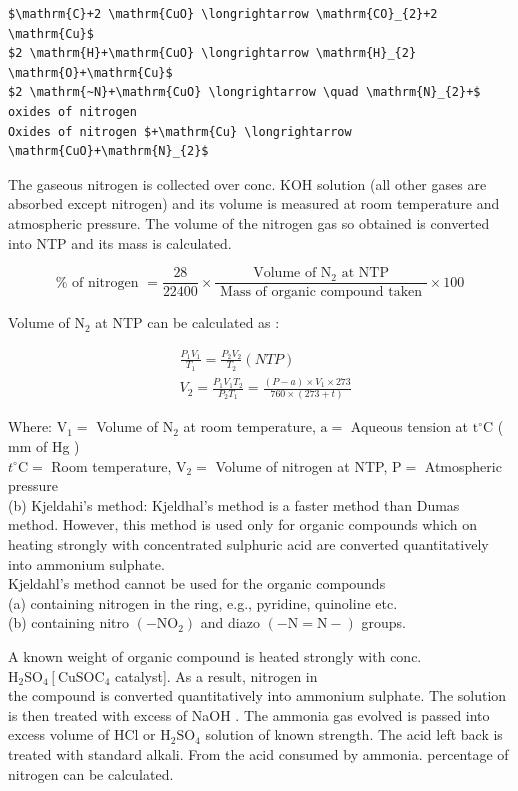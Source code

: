 \documentclass[10pt]{article}
\begin{document}
\begin{verbatim}
$\mathrm{C}+2 \mathrm{CuO} \longrightarrow \mathrm{CO}_{2}+2 \mathrm{Cu}$
$2 \mathrm{H}+\mathrm{CuO} \longrightarrow \mathrm{H}_{2} \mathrm{O}+\mathrm{Cu}$
$2 \mathrm{~N}+\mathrm{CuO} \longrightarrow \quad \mathrm{N}_{2}+$ oxides of nitrogen
Oxides of nitrogen $+\mathrm{Cu} \longrightarrow \mathrm{CuO}+\mathrm{N}_{2}$
\end{verbatim}

The gaseous nitrogen is collected over conc. KOH solution (all other gases are absorbed except nitrogen) and its volume is measured at room temperature and atmospheric pressure. The volume of the nitrogen gas so obtained is converted into NTP and its mass is calculated.

$$
\% \text { of nitrogen }=\frac{28}{22400} \times \frac{\text { Volume of } \mathrm{N}_{2} \text { at NTP }}{\text { Mass of organic compound taken }} \times 100
$$

Volume of $\mathrm{N}_{2}$ at NTP can be calculated as :

$$
\begin{aligned}
& \frac{P_{1} V_{1}}{T_{1}}=\frac{P_{2} V_{2}}{T_{2}}(N T P) \\
& V_{2}=\frac{P_{1} V_{1} T_{2}}{P_{2} T_{1}}=\frac{(P-a) \times V_{1} \times 273}{760 \times(273+t)}
\end{aligned}
$$

Where: $\mathrm{V}_{1}=$ Volume of $\mathrm{N}_{2}$ at room temperature, $\mathrm{a}=$ Aqueous tension at $\mathrm{t}^{\circ} \mathrm{C}$ ( mm of Hg )\\
$t^{\circ} \mathrm{C}=$ Room temperature, $\mathrm{V}_{2}=$ Volume of nitrogen at NTP, $\mathrm{P}=$ Atmospheric pressure\\
(b) Kjeldahi's method: Kjeldhal's method is a faster method than Dumas method. However, this method is used only for organic compounds which on heating strongly with concentrated sulphuric acid are converted quantitatively into ammonium sulphate.\\
Kjeldahl's method cannot be used for the organic compounds\\
(a) containing nitrogen in the ring, e.g., pyridine, quinoline etc.\\
(b) containing nitro $\left(-\mathrm{NO}_{2}\right)$ and diazo $(-\mathrm{N}=\mathrm{N}-)$ groups.

A known weight of organic compound is heated strongly with conc. $\mathrm{H}_{2} \mathrm{SO}_{4}\left[\mathrm{CuSO} \mathrm{C}_{4}\right.$ catalyst]. As a result, nitrogen in\\
the compound is converted quantitatively into ammonium sulphate. The solution is then treated with excess of NaOH . The ammonia gas evolved is passed into excess volume of HCl or $\mathrm{H}_{2} \mathrm{SO}_{4}$ solution of known strength. The acid left back is treated with standard alkali. From the acid consumed by ammonia. percentage of nitrogen can be calculated.
\end{document}
